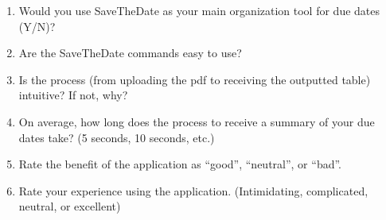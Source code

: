 \documentclass[12pt, titlepage]{article}
\begin{document}
\begin{enumerate}

\item Would you use SaveTheDate as your main organization tool for due dates (Y/N)? 

\item Are the SaveTheDate commands easy to use? 

\item Is the process (from uploading the pdf to receiving the outputted table) intuitive? If not, why? 

\item On average, how long does the process to receive a summary of your due dates take? (5 seconds, 10 seconds, etc.) 

\item Rate the benefit of the application as “good”, “neutral”, or “bad”.  

\item Rate your experience using the application. (Intimidating, complicated, neutral, or excellent) 

\end{enumerate}
\end{document}
